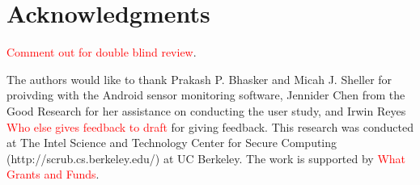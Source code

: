 \documentclass{soups}
\begin{document}
\section{Acknowledgments}
\textcolor{red}{Comment out for double blind review}. 

The authors would like to thank Prakash P. Bhasker and Micah J. Sheller for proivding with the Android sensor monitoring software, Jennider Chen from the Good Research for her assistance on conducting the user study, and Irwin Reyes \textcolor{red}{Who else gives feedback to draft} for giving feedback. 
This research was conducted at The Intel Science and Technology Center for Secure Computing (http://scrub.cs.berkeley.edu/) at UC Berkeley. 
The work is supported by \textcolor{red}{What Grants and Funds}. 





%
\end{document}
